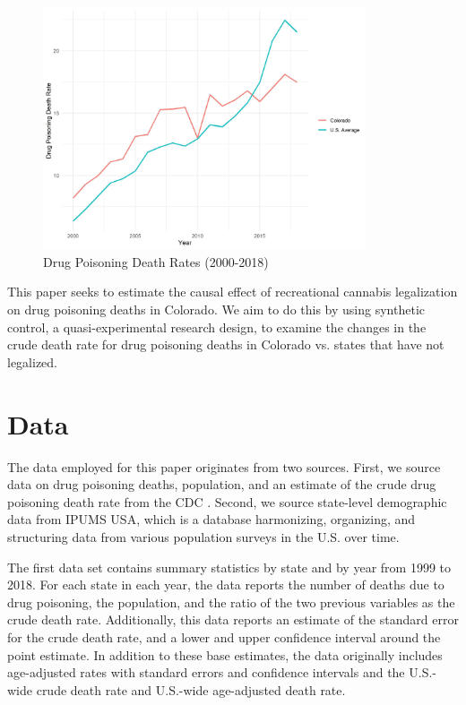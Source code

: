 \documentclass{article}
\begin{document}
\begin{figure}[H]
	\begin{center}
		\includegraphics[width=0.85\textwidth]{death_rates_trend}
	\end{center}
	\caption{Drug Poisoning Death Rates (2000-2018)}
	\label{fig:death_rates_trend}
\end{figure}

This paper seeks to estimate the causal effect of recreational cannabis legalization on drug poisoning deaths in Colorado. We aim to do this by using synthetic control, a quasi-experimental research design, to examine the changes in the crude death rate for drug poisoning deaths in Colorado vs. states that have not legalized. 

\section{Data}

The data employed for this paper originates from two sources. First, we source data on drug poisoning deaths, population, and an estimate of the crude drug poisoning death rate from the CDC \citep{cdc}. Second, we source state-level demographic data from IPUMS USA, which is a database harmonizing, organizing, and structuring data from various population surveys in the U.S. over time.\citep{ipums}

The first data set contains summary statistics by state and by year from 1999 to 2018. For each state in each year, the data reports the number of deaths due to drug poisoning, the population, and the ratio of the two previous variables as the crude death rate. Additionally, this data reports an estimate of the standard error for the crude death rate, and a lower and upper confidence interval around the point estimate. In addition to these base estimates, the data originally includes age-adjusted rates with standard errors and confidence intervals and the U.S.-wide crude death rate and U.S.-wide age-adjusted death rate. 
\end{document}
